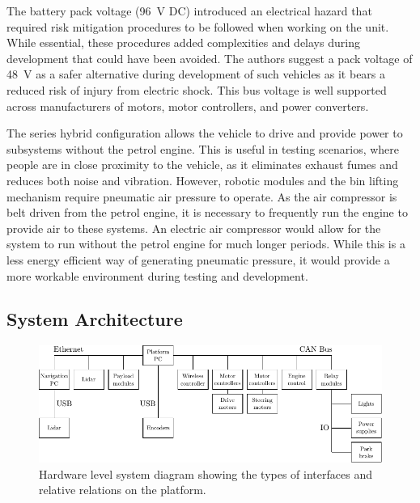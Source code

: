 \documentclass[preprint,authoryear,12pt]{elsarticle}
\begin{document}
        The battery pack voltage (\SI{96}{\volt} DC) introduced an electrical hazard that required risk mitigation procedures to be followed when working on the unit.
        While essential, these procedures added complexities and delays during development that could have been avoided.
        The authors suggest a pack voltage of \SI{48}{\volt} as a safer alternative during development of such vehicles as it bears a reduced risk of injury from electric shock.
        This bus voltage is well supported across manufacturers of motors, motor controllers, and power converters.

        The series hybrid configuration allows the vehicle to drive and provide power to subsystems without the petrol engine.
        This is useful in testing scenarios, where people are in close proximity to the vehicle, as it eliminates exhaust fumes and reduces both noise and vibration.
        However, robotic modules and the bin lifting mechanism require pneumatic air pressure to operate.
        As the air compressor is belt driven from the petrol engine, it is necessary to frequently run the engine to provide air to these systems.
        An electric air compressor would allow for the system to run without the petrol engine for much longer periods.
        While this is a less energy efficient way of generating pneumatic pressure, it would provide a more workable environment during testing and development.

    \subsection{System Architecture}
    \label{sect:architecture}

        \begin{figure}[htb]
            \centering
            \includegraphics[width=\linewidth]{imgs/system_diagram/diagram_v3.pdf}
            \caption{Hardware level system diagram showing the types of interfaces and relative relations on the platform.}
            \label{fig:system_diagram}
        \end{figure}
\end{document}
